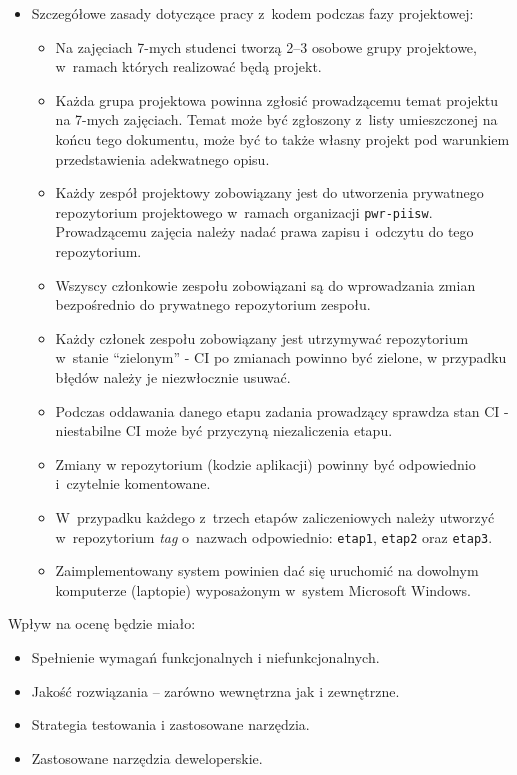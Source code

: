 \documentclass[12pt]{article}
\begin{document}
\begin{itemize}
\begin{itemize}
                \end{itemize}
            \item Szczegółowe zasady dotyczące pracy z~kodem podczas fazy projektowej:
                \begin{itemize}
                    \item Na zajęciach 7-mych studenci tworzą 2--3 osobowe grupy projektowe, w~ramach których realizować będą projekt.
                    \item Każda grupa projektowa powinna zgłosić prowadzącemu temat projektu na 7-mych zajęciach. Temat może być zgłoszony z~listy umieszczonej na końcu tego dokumentu, może być to także własny projekt pod warunkiem przedstawienia adekwatnego opisu.
                    \item Każdy zespół projektowy zobowiązany jest do utworzenia prywatnego repozytorium projektowego w~ramach organizacji \texttt{pwr-piisw}. Prowadzącemu zajęcia należy nadać prawa zapisu i~odczytu do tego repozytorium.
                    \item Wszyscy członkowie zespołu zobowiązani są do wprowadzania zmian bezpośrednio do prywatnego repozytorium zespołu.
                    \item Każdy członek zespołu zobowiązany jest utrzymywać repozytorium w~stanie “zielonym” - CI po zmianach powinno być zielone, w przypadku błędów należy je niezwłocznie usuwać.
                    \item Podczas oddawania danego etapu zadania prowadzący sprawdza stan CI - niestabilne CI może być przyczyną niezaliczenia etapu.
                    \item Zmiany w repozytorium (kodzie aplikacji) powinny być odpowiednio i~czytelnie komentowane.
                    \item W~przypadku każdego z~trzech etapów zaliczeniowych należy utworzyć w~repozytorium \textit{tag} o~nazwach odpowiednio: \texttt{etap1}, \texttt{etap2} oraz \texttt{etap3}.
                    \item Zaimplementowany system powinien dać się uruchomić na dowolnym komputerze (laptopie) wyposażonym w~system Microsoft Windows.
                \end{itemize}
        \end{itemize}

    \noindent Wpływ na ocenę będzie miało:
    \begin{itemize}
        \item Spełnienie wymagań funkcjonalnych i niefunkcjonalnych.
        \item Jakość rozwiązania – zarówno wewnętrzna jak i zewnętrzne.
        \item Strategia testowania i zastosowane narzędzia.
        \item Zastosowane  narzędzia deweloperskie.
    \end{itemize}
\end{document}
